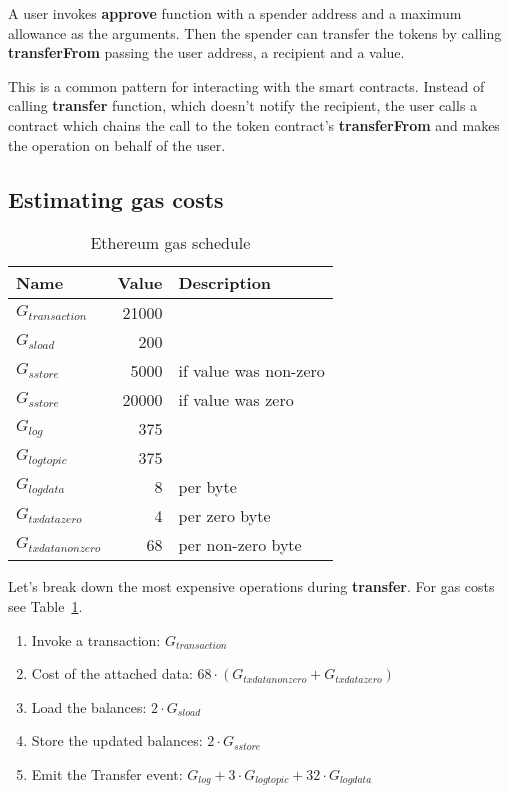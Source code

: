 \documentclass[12pt]{article}
\begin{document}
A user invokes \textbf{approve} function with a spender address and a maximum allowance as the arguments.
Then the spender can transfer the tokens by calling \textbf{transferFrom} passing the user address, a recipient and a value.

This is a common pattern for interacting with the smart contracts.
Instead of calling \textbf{transfer} function, which doesn't notify the recipient, the user calls a contract which chains the call to the token contract's \textbf{transferFrom} and makes the operation on behalf of the user.

\subsection{Estimating gas costs}

\begin{table}[h]
\caption{Ethereum gas schedule\cite{yellowpaper}}
\label{gas-costs}
\begin{center}
\begin{tabular}{l r l}
	Name & Value & Description \\ \midrule
	$G_{transaction}$ & 21000 \\
	$G_{sload}$ & 200 \\
	$G_{sstore}$ & 5000 & if value was non-zero \\
	$G_{sstore}$ & 20000 & if value was zero \\
	$G_{log}$ & 375 \\
	$G_{logtopic}$ & 375 \\
	$G_{logdata}$ & 8 & per byte \\
	$G_{txdatazero}$ & 4 & per zero byte \\
	$G_{txdatanonzero}$ & 68 & per non-zero byte \\
\end{tabular}
\end{center}
\end{table}
%
Let's break down the most expensive operations during \textbf{transfer}.
For gas costs see Table~\ref{gas-costs}.

\begin{enumerate}
	\item Invoke a transaction: $G_{transaction}$
	\item Cost of the attached data: $68 \cdot (G_{txdatanonzero} + G_{txdatazero})$
	\item Load the balances: $2 \cdot G_{sload}$
	\item Store the updated balances: $2 \cdot G_{sstore}$
	\item Emit the Transfer event: $G_{log} + 3 \cdot G_{logtopic} + 32 \cdot G_{logdata}$
\end{enumerate}
\end{document}
